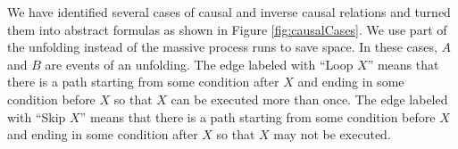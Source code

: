 \documentclass{llncs}
\begin{document}
We have identified several cases of causal and inverse causal relations and turned them into abstract formulas as shown in Figure \ref{fig:causalCases}. We use part of the unfolding instead of the massive process runs to save space. In these cases, $A$ and $B$ are events of an unfolding. The edge labeled with ``Loop $X$'' means that there is a path starting from some condition after $X$ and ending in some condition before $X$ so that $X$ can be executed more than once. The edge labeled with ``Skip $X$'' means that there is a path starting from some condition before $X$ and ending in some condition after $X$ so that $X$ may not be executed. %
\\
\begin{figure}[htbp]
\centering
{}
\end{figure}
\end{document}

